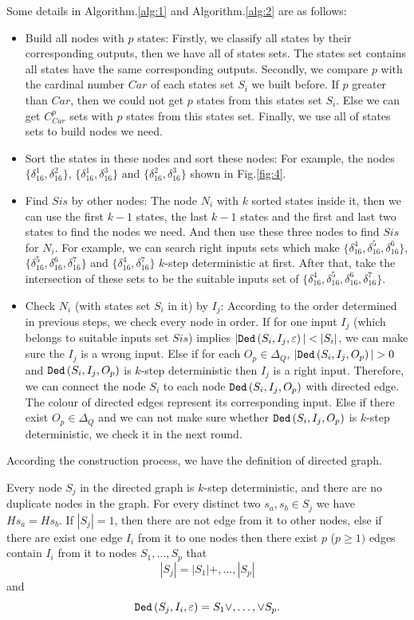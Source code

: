 Some details in Algorithm.\ref{alg:1} and Algorithm.\ref{alg:2} are as follows:
\begin{itemize}
\item Build all nodes with $p$ states: Firstly, we classify all states by their corresponding outputs, then we have all of states sets. The states set contains all states have the same corresponding outputs. Secondly, we compare $p$ with the cardinal number $Car$ of each states set $S_i$ we built before. If $p$ greater than $Car$, then we could not get $p$ states from this states set $S_i$. Else we can get $C_{Car}^p$ sets with $p$ states from this states set. Finally, we use all of states sets to build nodes we need. 
 \item Sort the states in these nodes and sort these nodes: For example, the nodes $\{\delta_{16}^1,\delta_{16}^2\}$, $\{\delta_{16}^1,\delta_{16}^3\}$ and $\{\delta_{16}^2,\delta_{16}^3\}$ shown in Fig.\ref{fig:4}. 
  \item Find $Sis$ by other nodes: The node $N_i$ with $k$ sorted states inside it, then we can use the first $k-1$ states, the last $k-1$ states and the first and last two states to find the nodes we need. And then use these three nodes to find $Sis$ for $N_i$. For example, we can search right inputs sets which make $\{\delta_{16}^4,\delta_{16}^5,\delta_{16}^6\}$, $\{\delta_{16}^5,\delta_{16}^6,\delta_{16}^7\}$ and $\{\delta_{16}^4,\delta_{16}^7\}$ $k$-step deterministic at first. After that, take the intersection of these sets to be the suitable inputs set of $\{\delta_{16}^4,\delta_{16}^5,\delta_{16}^6,\delta_{16}^7\}$. 
  \item Check $N_i$ (with states set $S_i$ in it) by $I_j$: According to the order determined in previous steps, we check every node in order. If for one input $I_j$ (which belongs to suitable inputs set $Sis$) implies $|\Ded\left(S_i,I_j,\varepsilon\right)|<|S_i|$, we can make sure the $I_j$ is a wrong input. Else if for each $O_p \in \Delta_Q$, $|\Ded\left(S_i,I_j,O_p\right)|>0$ and ${\tt Ded}\left(S_i,I_j,O_p\right)$ is $k$-step deterministic then $I_j$ is a right input. Therefore, we can connect the node $S_i$ to each node ${\tt Ded}\left(S_i,I_j,O_p\right)$ with directed edge. The colour of directed edges represent its corresponding input. Else if there exist $O_p \in \Delta_Q$ and we can not make sure whether ${\tt Ded}\left(S_i,I_j,O_p\right)$ is $k$-step deterministic, we check it in the next round. 
\end{itemize} 

According the construction process, we have the definition of directed graph.
\begin{definition}
Every node $S_j$ in the directed graph is $k$-step deterministic, and there are no duplicate nodes in the graph. For every distinct two $s_a, s_b \in S_j$ we have $Hs_a=Hs_b$. If $|S_j|=1$, then there are not edge from it to other nodes, else if there are exist one edge $I_i$ from it to one nodes then there exist $p$ ($p\ge 1)$ edges contain $I_i$ from it to nodes $S_1,\ldots,S_p$ that \[|S_j|= |S_1|+,\ldots,|S_p|\] and \[{\tt Ded}\left(S_j,I_i,\varepsilon\right)=S_1\vee,\ldots,\vee S_p.\]
\end{definition}


